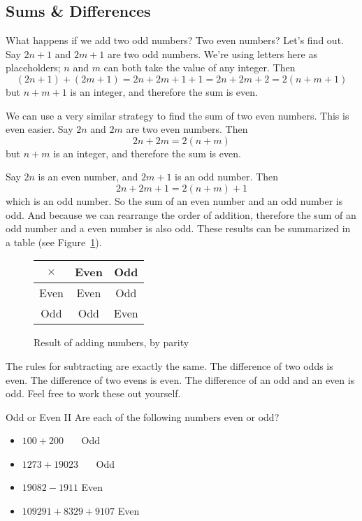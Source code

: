 \documentclass[a4paper,10pt]{report}
\begin{document}
\subsection{Sums \& Differences}

What happens if we add two odd numbers? Two even numbers? Let's find out. Say
$2n+1$ and $2m+1$ are two odd numbers. We're using letters here as placeholders;
$n$ and $m$ can both take the value of any integer. Then \[
 (2n+1) + (2m+1) = 2n + 2m + 1 + 1 = 2n + 2m + 2 = 2(n+m+1)
\] but $n+m+1$ is an integer, and therefore the sum is even.

We can use a very similar strategy to find the sum of two even numbers. This is
even easier. Say $2n$ and $2m$ are two even numbers. Then \[
 2n + 2m = 2(n+m)
\] but $n+m$ is an integer, and therefore the sum is even.

Say $2n$ is an even number, and $2m+1$ is an odd number. Then \[
 2n + 2m + 1 = 2(n+m) + 1
\] which is an odd number. So the sum of an even number and an odd number is
odd. And because we can rearrange the order of addition, therefore the sum of an
odd number and a even number is also odd. These results can be summarized in a
table (see Figure~\ref{pd:psumt}).

\begin{figure}
 \begin{tabular}{c|cc}
  $\times$ & Even & Odd  \\
  \hline
  Even   & Even & Odd \\
  Odd    & Odd & Even
 \end{tabular}

 \caption{Result of adding numbers, by parity}
 \label{pd:psumt}
\end{figure}

The rules for subtracting are exactly the same. The difference of two odds is
even. The difference of two evens is even. The difference of an odd and an even
is odd. Feel free to work these out yourself.

\begin{problem}{Odd or Even II}
 Are each of the following numbers even or odd?

 \begin{itemize}
  \item $100 + 200$ \hfill {}~~~Odd
  \item $1273 + 19023$ \hfill {}~~~Odd
  \item $19082 - 1911$ \hfill Even~~~
  \item $109291 + 8329 + 9107$ \hfill Even~~~
 \end{itemize}
\end{problem}
\end{document}
